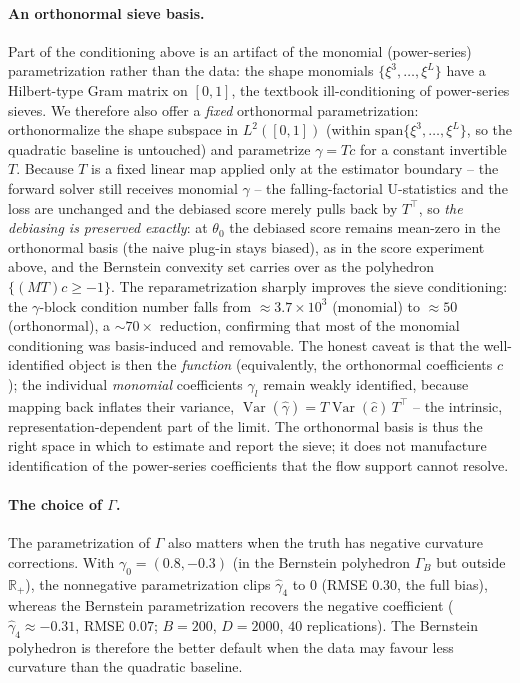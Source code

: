 \documentclass[12pt]{article}
\begin{document}
\paragraph{An orthonormal sieve basis.} Part of the conditioning above is an
artifact of the monomial (power-series) parametrization rather than the data: the
shape monomials $\{\xi^3,\dots,\xi^L\}$ have a Hilbert-type Gram matrix on $[0,1]$,
the textbook ill-conditioning of power-series sieves. We therefore also offer a
\emph{fixed} orthonormal parametrization: orthonormalize the shape subspace in
$L^2([0,1])$ (within $\mathrm{span}\{\xi^3,\dots,\xi^L\}$, so the quadratic baseline
is untouched) and parametrize $\gamma = T c$ for a constant invertible $T$. Because
$T$ is a fixed linear map applied only at the estimator boundary -- the forward
solver still receives monomial $\gamma$ -- the falling-factorial U-statistics and
the loss are unchanged and the debiased score merely pulls back by $T^\top$, so
\emph{the debiasing is preserved exactly}: at $\theta_0$ the debiased score remains
mean-zero in the orthonormal basis (the naive plug-in stays biased), as in the
score experiment above, and the Bernstein convexity set carries over as the
polyhedron $\{(MT)c \ge -1\}$. The reparametrization sharply improves the sieve
conditioning: the $\gamma$-block condition number falls from $\approx 3.7\times10^3$
(monomial) to $\approx 50$ (orthonormal), a $\sim\!70\times$ reduction, confirming
that most of the monomial conditioning was basis-induced and removable. The honest
caveat is that the well-identified object is then the \emph{function} (equivalently,
the orthonormal coefficients $c$); the individual \emph{monomial} coefficients
$\gamma_l$ remain weakly identified, because mapping back inflates their variance,
$\operatorname{Var}(\hat\gamma) = T\operatorname{Var}(\hat c)\,T^\top$ -- the
intrinsic, representation-dependent part of the limit. The orthonormal basis is thus
the right space in which to estimate and report the sieve; it does not manufacture
identification of the power-series coefficients that the flow support cannot resolve.

\paragraph{The choice of $\Gamma$.} The parametrization of $\Gamma$ also
matters when the truth has negative curvature corrections. With
$\gamma_0=(0.8,-0.3)$ (in the Bernstein polyhedron $\Gamma_B$ but outside
$\mathbb{R}_+$), the nonnegative parametrization clips $\hat\gamma_4$ to $0$
(RMSE $0.30$, the full bias), whereas the Bernstein parametrization recovers the
negative coefficient ($\hat\gamma_4 \approx -0.31$, RMSE $0.07$; $B=200$, $D=2000$,
$40$ replications). The Bernstein polyhedron is therefore the better default when
the data may favour less curvature than the quadratic baseline.
\end{document}
